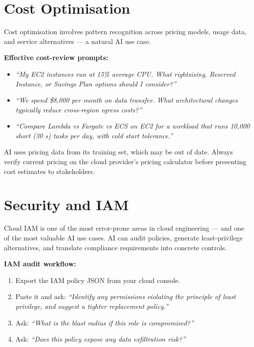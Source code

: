 \section{Cost Optimisation}
\label{sec:cost}

Cost optimisation involves pattern recognition across pricing models, usage data, and
service alternatives --- a natural AI use case.

\textbf{Effective cost-review prompts:}
\begin{itemize}
  \item \textit{``My EC2 instances run at 15\% average CPU. What rightsizing, Reserved Instance, or Savings Plan options should I consider?''}
  \item \textit{``We spend \$8,000 per month on data transfer. What architectural changes typically reduce cross-region egress costs?''}
  \item \textit{``Compare Lambda vs Fargate vs ECS on EC2 for a workload that runs 10,000 short (30 s) tasks per day, with cold start tolerance.''}
\end{itemize}

\begin{warnbox}
AI uses pricing data from its training set, which may be out of date.
Always verify current pricing on the cloud provider's pricing calculator before
presenting cost estimates to stakeholders.
\end{warnbox}

\section{Security and IAM}
\label{sec:cloud-security}

Cloud IAM is one of the most error-prone areas in cloud engineering --- and one of the
most valuable AI use cases.
AI can audit policies, generate least-privilege alternatives, and translate compliance
requirements into concrete controls.

\textbf{IAM audit workflow:}
\begin{enumerate}
  \item Export the IAM policy JSON from your cloud console.
  \item Paste it and ask: \textit{``Identify any permissions violating the principle of
        least privilege, and suggest a tighter replacement policy.''}
  \item Ask: \textit{``What is the blast radius if this role is compromised?''}
  \item Ask: \textit{``Does this policy expose any data exfiltration risk?''}
\end{enumerate}

